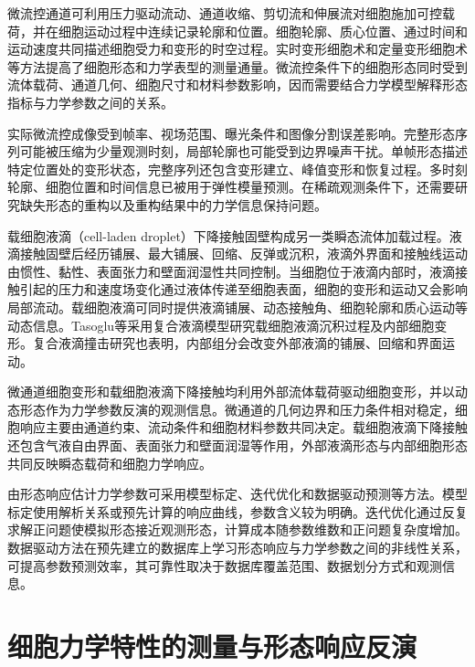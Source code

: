 微流控通道可利用压力驱动流动、通道收缩、剪切流和伸展流对细胞施加可控载荷，并在细胞运动过程中连续记录轮廓和位置。细胞轮廓、质心位置、通过时间和运动速度共同描述细胞受力和变形的时空过程。实时变形细胞术和定量变形细胞术等方法提高了细胞形态和力学表型的测量通量\cite{otto2015rtdc,nyberg2017qdc,rosendahl2018rtdc}。微流控条件下的细胞形态同时受到流体载荷、通道几何、细胞尺寸和材料参数影响，因而需要结合力学模型解释形态指标与力学参数之间的关系\cite{mietke2015rtdc,mokbel2017rtdc}。

实际微流控成像受到帧率、视场范围、曝光条件和图像分割误差影响。完整形态序列可能被压缩为少量观测时刻，局部轮廓也可能受到边界噪声干扰。单帧形态描述特定位置处的变形状态，完整序列还包含变形建立、峰值变形和恢复过程。多时刻轮廓、细胞位置和时间信息已被用于弹性模量预测\cite{gong2024prediction}。在稀疏观测条件下，还需要研究缺失形态的重构以及重构结果中的力学信息保持问题。

载细胞液滴（cell-laden droplet）下降接触固壁构成另一类瞬态流体加载过程。液滴接触固壁后经历铺展、最大铺展、回缩、反弹或沉积，液滴外界面和接触线运动由惯性、黏性、表面张力和壁面润湿性共同控制\cite{rein1993impact,yarin2006impact,josserand2016drop,snoeijer2013moving}。当细胞位于液滴内部时，液滴接触引起的压力和速度场变化通过液体传递至细胞表面，细胞的变形和运动又会影响局部流动。载细胞液滴可同时提供液滴铺展、动态接触角、细胞轮廓和质心运动等动态信息。Tasoglu等采用复合液滴模型研究载细胞液滴沉积过程及内部细胞变形\cite{tasoglu2010compound}。复合液滴撞击研究也表明，内部组分会改变外部液滴的铺展、回缩和界面运动\cite{blanken2021compoundperspective}。

微通道细胞变形和载细胞液滴下降接触均利用外部流体载荷驱动细胞变形，并以动态形态作为力学参数反演的观测信息。微通道的几何边界和压力条件相对稳定，细胞响应主要由通道约束、流动条件和细胞材料参数共同决定。载细胞液滴下降接触还包含气液自由界面、表面张力和壁面润湿等作用，外部液滴形态与内部细胞形态共同反映瞬态载荷和细胞力学响应\cite{tasoglu2010compound,blanken2021compoundperspective,freund2014bloodcells}。

由形态响应估计力学参数可采用模型标定、迭代优化和数据驱动预测等方法。模型标定使用解析关系或预先计算的响应曲线，参数含义较为明确。迭代优化通过反复求解正问题使模拟形态接近观测形态，计算成本随参数维数和正问题复杂度增加。数据驱动方法在预先建立的数据库上学习形态响应与力学参数之间的非线性关系，可提高参数预测效率，其可靠性取决于数据库覆盖范围、数据划分方式和观测信息\cite{raue2009identifiability,roberts2017crossvalidation,vabalas2019limited}。

\section{细胞力学特性的测量与形态响应反演}

